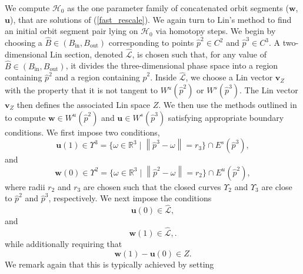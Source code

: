 \documentclass{ws-ijbc}
\begin{document}
We compute $\mathscr{H}_0$ as the one parameter family of concatenated orbit segments ($\mathbf{w}$, $\mathbf{u}$), that are solutions of (\ref{fast_rescale}).  We again turn to Lin's method to find an initial orbit segment pair lying on $\mathscr{H}_0$ via homotopy steps.  We begin by choosing a $\widehat{B} \in (B_{\text{in}}, B_{\text{out}})$ corresponding to points $\widehat{p}^2 \in C^2$ and $\widehat{p}^3 \in C^3$.  A two-dimensional Lin section, denoted $\widehat{\mathscr{L}}$, is chosen such that, for any value of $\widehat{B} \in (B_{\text{in}}, B_{\text{out}})$, it divides the three-dimensional phase space into a region containing $\widehat{p}^2$ and a region containing $\widehat{p}^2$.  Inside $\widehat{\mathscr{L}}$, we choose a Lin vector $\mathbf{v}_Z$ with the property that it is not tangent to $W^u(\widehat{p}^2)$ or $W^s(\widehat{p}^3)$.  The Lin vector $\mathbf{v}_Z$ then defines the associated Lin space $Z$.    We then use the methods outlined in \cite{Red_book} to compute $\mathbf{w} \in W^u(\widehat{p}^2)$ and $\mathbf{u} \in W^s(\widehat{p}^3)$ satisfying appropriate boundary conditions.  We first impose two conditions,
\begin{equation}
	\mathbf{u}(1) \in \Upsilon^3= \{ \omega \in \mathbb{R}^3  \; | \; \left\lVert \widehat{p}^3 - \omega \right\lVert = r_3 \} \cap E^s(\widehat{p}^3),
	\label{general_conditions_heteroclinic_singular_1}
\end{equation}
and
\begin{equation}
	\mathbf{w}(0) \in \Upsilon^2= \{ \omega \in \mathbb{R}^3  \; | \; \left\lVert \widehat{p}^2 - \omega \right\lVert = r_2 \} \cap E^u(\widehat{p}^2),
	\label{general_conditions_heteroclinic_singular_2}
\end{equation}
where radii $r_2$ and $r_3$ are chosen such that the closed curves $\Upsilon_2$ and $\Upsilon_3$ are close to $\widehat{p}^2$ and $\widehat{p}^3$, respectively.  We next impose the conditions
\begin{equation}
	\mathbf{u}(0) \in \widehat{\mathscr{L}},
	\label{general_conditions_heteroclinic_singular_3}
\end{equation}
and
\begin{equation}
	\mathbf{w}(1) \in \widehat{\mathscr{L}},
	\label{general_conditions_heteroclinic_singular_4}.
\end{equation}
while additionally requiring that
	\begin{equation*}
		\mathbf{w}(1)-\mathbf{u}(0) \in Z.
	\end{equation*}
We remark again that this is typically achieved by setting
\end{document}
